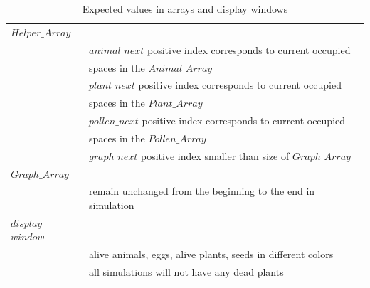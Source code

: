 \documentclass[3p,,preprint,12pt]{elsarticle}
\begin{document}
\begin{table}[!htb]
\begin{tabular}{ l l }
 $Helper\_Array$ & \\
 & $animal\_next$ positive index corresponds to current occupied \\
 & spaces in the $Animal\_Array$\\
 & $plant\_next$ positive index corresponds to current occupied \\
 & spaces in the $Plant\_Array$\\
 & $pollen\_next$ positive index corresponds to current occupied \\
 & spaces in the $Pollen\_Array$\\
 & $graph\_next$ positive index smaller than size of $Graph\_Array$\\
 $Graph\_Array$ & \\
 & remain unchanged from the beginning to the end in simulation\\
 $display$ $window$ & \\
 & alive animals, eggs, alive plants, seeds in different colors\\
 & all simulations will not have any dead plants\\
\end{tabular}
\caption{\label{tab:table-name}Expected values in arrays and display windows}
\end{table}
\end{document}
